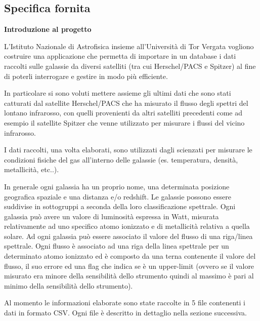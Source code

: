 \documentclass[12pt,a4paper,onecolumn,x11names]{article}
\begin{document}
	\subsection{Specifica fornita}
	\begin{flushleft}
		\textbf{Introduzione al progetto}\newline
		
		L’Istituto Nazionale di Astrofisica insieme all’Università di Tor Vergata vogliono costruire una applicazione che permetta di importare in un database i dati raccolti sulle galassie da diversi satelliti (tra cui Herschel/PACS e Spitzer) al fine di poterli interrogare e gestire in modo più efficiente.\newline
		
		In particolare si sono voluti mettere assieme gli ultimi dati che sono stati catturati dal satellite Herschel/PACS che ha misurato il flusso degli spettri del lontano infrarosso, con quelli provenienti da altri satelliti precedenti come ad esempio il satellite Spitzer che venne utilizzato per misurare i flussi del vicino infrarosso.\newline
		
		I dati raccolti, una volta elaborati, sono utilizzati dagli scienzati per misurare le condizioni fisiche del gas all’interno delle galassie (es. temperatura, densità, metallicità, etc..).\newline
		
		In generale ogni galassia ha un proprio nome, una  determinata posizione geografica spaziale e una distanza e/o redshift. Le galassie possono essere suddivise in sottogruppi a seconda della loro classificazione spettrale. Ogni galassia può avere un valore di luminosità espressa in Watt, misurata relativamente ad uno specifico atomo ionizzato e di metallicità relativa a quella solare. Ad ogni galassia può essere associato il valore del flusso di una riga/linea spettrale. Ogni flusso è associato ad una riga della linea spettrale per un determinato atomo ionizzato ed è composto da una terna contenente il valore del flusso, il suo errore ed una flag che indica se è un upper-limit (ovvero se il valore misurato era minore della sensibilità dello strumento quindi al massimo è pari al minimo della sensibilità dello strumento).\newline
		
		Al momento le informazioni elaborate sono state raccolte in 5 file contenenti i dati in formato CSV. Ogni file è descritto in dettaglio nella sezione successiva.\newline\newline
		

\end{flushleft}
\end{document}
